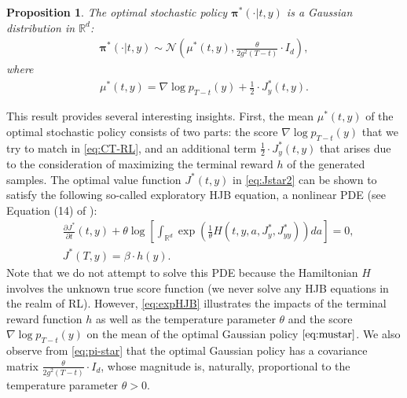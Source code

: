\documentclass[11pt]{article}
\newtheorem{proposition}{Proposition}
\newcommand{\bpi}{\boldsymbol{\pi}}
\begin{document}
\begin{proposition}\label{prop:optimal-policy}
The optimal stochastic policy $\bpi^* (\cdot| t, y)$ is a Gaussian distribution in $\mathbb{R}^d$:
\begin{align}\label{eq:pi-star}
\bpi^{*}(\cdot|t,y)   \sim  \mathcal{N}\left(\mu^{*}(t,y), \frac{\theta}{2 g^2(T-t)}  \cdot I_{d} \right) , %
\end{align}
where
\begin{align}\label{eq:mustar}
\mu^{*}(t,y) =  \nabla\log p_{T-t}(y)  + \frac{1}{2} \cdot J_y^*(t, y).
\end{align}
\end{proposition}
This result provides several interesting insights. First, the mean $\mu^{*}(t,y)$ of the optimal stochastic policy consists of two parts: the score $\nabla\log p_{T-t}(y)$ that we try to match in \eqref{eq:CT-RL}, and an additional term $\frac{1}{2} \cdot J_y^*(t, y)$ that arises due to the consideration of maximizing the terminal reward $h$ of the generated samples. The optimal value function $J^*(t, y) $ in \eqref{eq:Jstar2} can be shown to satisfy the following so-called exploratory HJB equation, a nonlinear PDE (see Equation (14) of \citealp{jia2023q}):
\begin{align}\label{eq:expHJB}
&\frac{\partial J^*}{ \partial t} (t, y ) + \theta \log \left[   \int_{\mathbb{R}^d} \exp \left(\frac{1}{\theta} H(t, y, a, J^*_y,  J^*_{yy})  \right)  da \right]  = 0, \\
& J^*(T, y) =\beta \cdot h(y).
\end{align}
Note that we do not attempt to solve this PDE  because the Hamiltonian $H$ involves the unknown true score function (we never solve any HJB equations in the realm of RL).
However, \eqref{eq:expHJB} illustrates the impacts of the terminal reward function $h$ as well as the temperature parameter $\theta$ and the score $\nabla\log p_{T-t}(y)$ on the mean of the optimal Gaussian policy $\eqref{eq:mustar}$.
 We also observe from \eqref{eq:pi-star} that the optimal Gaussian policy has a covariance matrix $\frac{\theta}{2 g^2(T-t)}  \cdot I_{d}$, whose magnitude is, naturally,  proportional to the temperature parameter $\theta>0$.
\end{document}

